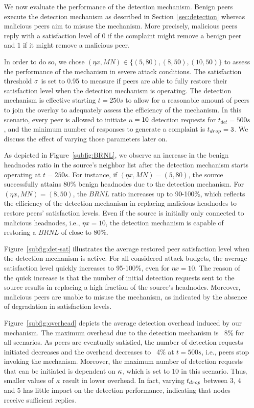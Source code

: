 We now evaluate the performance of the detection mechanism.
Benign peers execute the detection mechanism as described in Section~\ref{sec:detection} whereas malicious peers aim to misuse the mechanism.
More precisely, malicious peers reply with a satisfaction level of 0 if the complaint might remove a benign peer and 1 if it might remove a malicious peer. 

In order to do so, we chose $(\eta x, MN) \in \{(5, 80), (8, 50), (10, 50)\}$ to assess the performance of the mechanism in severe attack conditions.
The satisfaction threshold $\sigma$ is set to 0.95 to measure if peers are able to fully restore their satisfaction level when the detection mechanism is operating.
The detection mechanism is effective starting $t=250s$ to allow for a reasonable amount of peers to join the overlay to adequately assess the efficiency of the mechanism.
In this scenario, every peer is allowed to initiate $\kappa=10$ detection requests for $t_{det}=500s$, and the minimum number of responses to generate a complaint is $t_{drop}=3$. 
We discuss the effect of varying those parameters later on.

As depicted in Figure~\ref{subfig:BRNL}, we observe an increase in the benign headnodes ratio in the source's neighbor list after the detection mechanism starts operating at $t=250s$.  
For instance, if $(\eta x, MN)=(5, 80)$, the source successfully attains 80\% benign headnodes due to the detection mechanism.
For $(\eta x, MN)=(8, 50)$, the $BRNL$ ratio increases up to 90-100\%, which reflects the efficiency of the detection mechanism in replacing malicious headnodes to restore peers' satisfaction levels. 
Even if the source is initially only connected to malicious headnodes, i.e., $\eta x=10$, the detection mechanism is capable of restoring a $BRNL$ of close to 80\%. 

Figure~\ref{subfig:det-sat} illustrates the average restored peer satisfaction level when the detection mechanism is active. 
For all considered attack budgets, the average satisfaction level quickly increases to 95-100\%, even for $\eta x=10$.
The reason of the quick increase is that the number of initial detection requests sent to the source results in replacing a high fraction of the source's headnodes. 
Moreover, malicious peers are unable to misuse the mechanism, as indicated by the absence of degradation in satisfaction levels. 

Figure~\ref{subfig:overhead} depicts the average detection overhead induced by our mechanism. 
The maximum overhead due to the detection mechanism is ~8\% for all scenarios.
As peers are eventually satisfied, the number of detection requests initiated decreases and the overhead decreases to ~4\% at $t=500s$, i.e., peers stop invoking the mechanism.
Moreover, the maximum number of detection requests that can be initiated is dependent on $\kappa$, which is set to 10 in this scenario.
Thus, smaller values of $\kappa$ result in lower overhead. 
In fact, varying $t_{drop}$ between 3, 4 and 5 has little impact on the detection performance, indicating that nodes receive sufficient replies.

